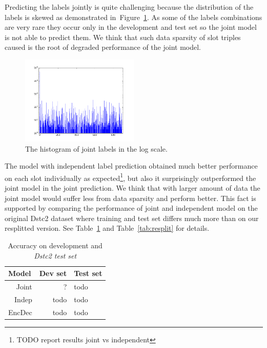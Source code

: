 \documentclass{itatnew}
\begin{document}
Predicting the labels jointly is quite challenging because the distribution of the labels is skewed as demonstrated in~Figure~\ref{fig:labels}.
As some of the labels combinations are very rare they occur only in the development and test set so the joint model is not able to predict them.
We think that such data sparsity of slot triples caused is the root of degraded performance of the joint model.
\begin{figure}
\includegraphics[width=0.5\textwidth]{dstc2_goals_joint_log_scale}
\caption{The histogram of joint labels in the log scale.}
\label{fig:labels}
\end{figure}

The model with independent label prediction obtained much better performance on each slot individually as expected\footnote{TODO report results joint vs independent}, but also it surprisingly outperformed the joint model in the joint prediction.
We think that with larger amount of data the joint model would suffer less from data sparsity and perform better.
This fact is supported by comparing the performance of joint and independent model on the original Dstc2 dataset where training and test set differs much more than on our resplitted version. 
See Table~\ref{tab:dstc} and Table~\ref{tab:resplit} for details.

\begin{table}
\caption{Accuracy on development and {\it Dstc2 test set }}
\begin{center}
\begin{tabular}{r@{\quad}rll}
\hline
\multicolumn{1}{l}{\rule{0pt}{12pt}
                   Model}&\multicolumn{1}{l}{Dev set}&\multicolumn{2}{l}{Test set}\\[2pt]
\hline\rule{0pt}{12pt}
Joint  &     ?&  todo \\
Indep  &   todo& todo \\
EncDec &   todo& todo \\
\hline
\end{tabular}
\end{center}
\label{tab:dstc}
\end{table}
\end{document}
